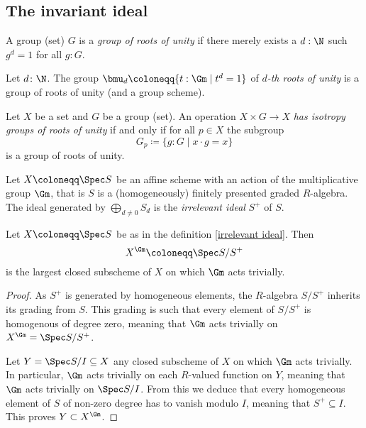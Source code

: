\subsection{The invariant ideal}

\begin{definition}
  A group (set) $G$ is a \emph{group of roots of unity} if there
  merely exists a $d : \N$ such $g^d = 1$ for all $g : G$.
\end{definition}

\begin{example}
  Let $d\colon \N$.  The group
  $\bmu_d \coloneqq \{t  : \Gm \mid t^d = 1\}$ of \emph{$d$-th
    roots of unity} is a group of roots of unity (and a group scheme).
\end{example}

\begin{definition}
  Let $X$ be a set and $G$ be a group (set).  An operation
  $X \times G \to X$ \emph{has isotropy groups of roots of unity} if
  and only if for all $p \in X$ the subgroup
  \begin{equation*}
    G_p \coloneqq \{g : G \mid x \cdot g = x\}
  \end{equation*}
  is a group of roots of unity.
\end{definition}

\begin{definition}\label{irrelevant ideal}
  Let $X \coloneqq \Spec S$ be an affine scheme with an action of the
  multiplicative group $\Gm$, that is $S$ is a (homogeneously)
  finitely presented graded $R$-algebra.  The ideal generated by
  $\bigoplus_{d \neq 0} S_d$ is the \emph{irrelevant ideal} $S^+$ of
  $S$.
\end{definition}

\begin{proposition}\label{invariant subscheme}
  Let $X \coloneqq \Spec S$ be as in the definition \cref{irrelevant ideal}.  Then
  \begin{equation*}
    X^{\Gm} \coloneqq \Spec S/S^+
  \end{equation*}
  is the largest closed subscheme of $X$ on which $\Gm$ acts trivially.
\end{proposition}

\begin{proof}
  As $S^+$ is generated by homogeneous elements, the $R$-algebra
  $S/S^+$ inherits its grading from $S$.  This grading is such that
  every element of $S/S^+$ is homogenous of degree zero, meaning that
  $\Gm$ acts trivially on $X^{\Gm} = \Spec S/S^+$.

  Let $Y = \Spec S/I \subseteq X$ any closed subscheme of $X$ on which
  $\Gm$ acts trivially.  In particular, $\Gm$ acts trivially on each
  $R$-valued function on $Y$, meaning that $\Gm$ acts trivially on
  $\Spec S/I$.  From this we deduce that every homogeneous element of
  $S$ of non-zero degree has to vanish modulo $I$, meaning that $S^+
  \subseteq I$.  This proves $Y \subset X^{\Gm}$.
\end{proof}

